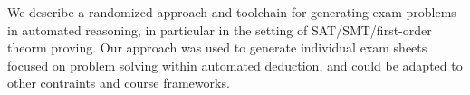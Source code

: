 We describe a randomized approach and toolchain for generating exam problems in automated reasoning,
in particular in the setting of SAT/SMT/first-order theorm proving. Our approach was used to generate individual exam sheets focused on problem solving within automated deduction, and could be adapted to other contraints and course frameworks. 